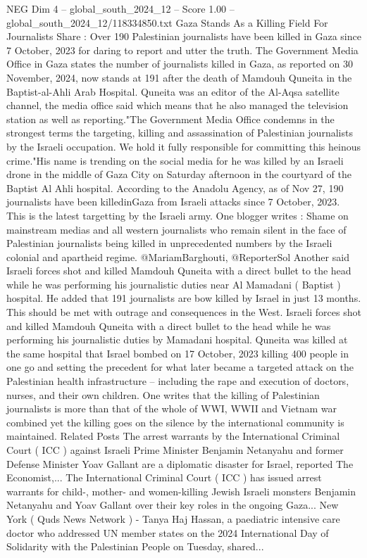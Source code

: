 \begin{textsample}{NEG Dim 4 – global\_south\_2024\_12 – Score 1.00 – global\_south\_2024\_12/118334850.txt}  \label{ex:f4_neg_203}
Gaza Stands As a Killing Field For Journalists Share : Over 190 Palestinian journalists have been killed in Gaza since 7 October, 2023 for daring to report and utter the truth.
The Government Media Office in Gaza states the number of journalists killed in Gaza, as reported on 30 November, 2024, now stands at 191 after the death of Mamdouh Quneita in the Baptist-al-Ahli Arab Hospital.
Quneita was an editor of the Al-Aqsa satellite channel, the media office said which means that he also managed the television station as well as reporting."The Government Media Office condemns in the strongest terms the targeting, killing and assassination of Palestinian journalists by the Israeli occupation.
We hold it fully responsible for committing this heinous crime."His name is trending on the social media for he was killed by an Israeli drone in the middle of Gaza City on Saturday afternoon in the courtyard of the Baptist Al Ahli hospital.
According to the Anadolu Agency, as of Nov 27, 190 journalists have been killedinGaza from Israeli attacks since 7 October, 2023.
This is the latest targetting by the Israeli army.
One blogger writes : Shame on mainstream medias and all western journalists who remain silent in the face of Palestinian journalists being killed in unprecedented numbers by the Israeli colonial and apartheid regime. @MariamBarghouti, @ReporterSol Another said Israeli forces shot and killed Mamdouh Quneita with a direct bullet to the head while he was performing his journalistic duties near Al Mamadani ( Baptist ) hospital.
He added that 191 journalists are bow killed by Israel in just 13 months.
This should be met with outrage and consequences in the West.
Israeli forces shot and killed Mamdouh Quneita with a direct bullet to the head while he was performing his journalistic duties by Mamadani hospital.
Quneita was killed at the same hospital that Israel bombed on 17 October, 2023 killing 400 people in one go and setting the precedent for what later became a targeted attack on the Palestinian health infrastructure -- including the rape and execution of doctors, nurses, and their own children.
One writes that the killing of Palestinian journalists is more than that of the whole of WWI, WWII and Vietnam war combined yet the killing goes on the silence by the international community is maintained.
Related Posts The arrest warrants by the International Criminal Court ( ICC ) against Israeli Prime Minister Benjamin Netanyahu and former Defense Minister Yoav Gallant are a diplomatic disaster for Israel, reported The Economist,...
The International Criminal Court ( ICC ) has issued arrest warrants for child-, mother- and women-killing Jewish Israeli monsters Benjamin Netanyahu and Yoav Gallant over their key roles in the ongoing Gaza...
New York ( Quds News Network ) - Tanya Haj Hassan, a paediatric intensive care doctor who addressed UN member states on the 2024 International Day of Solidarity with the Palestinian People on Tuesday, shared...

\end{textsample}
